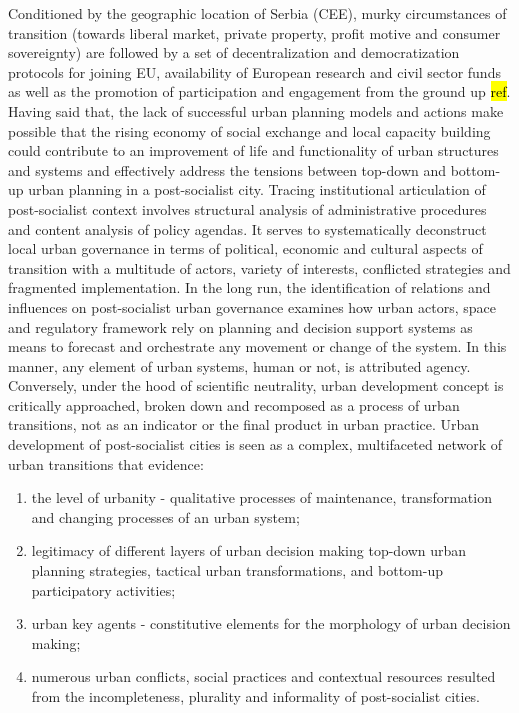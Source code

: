 \documentclass[11pt]{report}
\begin{document}
Conditioned by the geographic location of Serbia (CEE), murky circumstances of transition (towards liberal market, private property, profit motive and consumer sovereignty) are followed by a set of decentralization and democratization protocols for joining EU, availability of European research and civil sector funds as well as the promotion of participation and engagement from the ground up \hl{ref}. Having said that, the lack of successful urban planning models and actions make possible that the rising economy of social exchange and local capacity building could contribute to an improvement of life and functionality of urban structures and systems and effectively address the tensions between top-down and bottom-up urban planning in a post-socialist city. Tracing institutional articulation of post-socialist context involves structural analysis of administrative procedures and content analysis of policy agendas. It serves to systematically deconstruct local urban governance in terms of political, economic and cultural aspects of transition with a multitude of actors, variety of interests, conflicted strategies and fragmented implementation. In the long run, the identification of relations and influences on post-socialist urban governance examines how urban actors, space and regulatory framework rely on planning and decision support systems as means to forecast and orchestrate any movement or change of the system. In this manner, any element of urban systems, human or not, is attributed agency.
\\
Conversely, under the hood of scientific neutrality, urban development concept is critically approached, broken down and recomposed as a process of urban transitions, not as an indicator or the final product in urban practice. Urban development of post-socialist cities is seen as a complex, multifaceted network of urban transitions that evidence: 
\begin{enumerate}
\item the level of urbanity - qualitative processes of maintenance, transformation and changing processes of an urban system;
\item legitimacy of different layers of urban decision making top-down urban planning strategies, tactical urban transformations, and bottom-up participatory activities;
\item urban key agents - constitutive elements for the morphology of urban decision making;
\item numerous urban conflicts, social practices and contextual resources resulted from the incompleteness, plurality and informality of post-socialist cities.
\end{enumerate}  
\end{document}
